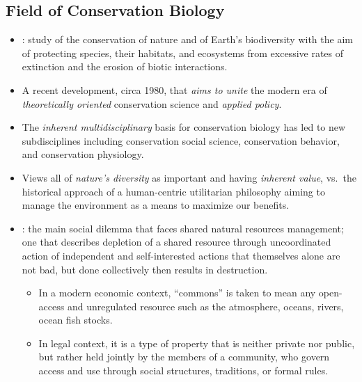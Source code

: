 \documentclass{inVerba-notes}
\begin{document}
\begin{itemize}
    \subsection{Field of Conservation Biology}\label{Field of Conservation Biology}
    \begin{itemize}
        \item {}: study of the conservation of nature and of Earth's biodiversity with the aim of protecting species, their habitats, and ecosystems from excessive rates of extinction and the erosion of biotic interactions.
        \item A recent development, circa 1980, that \emph{aims to unite} the modern era of \emph{theoretically oriented} conservation science and \emph{applied policy}.
        \item The \emph{inherent multidisciplinary} basis for conservation biology has led to new subdisciplines including conservation social science, conservation behavior, and conservation physiology.
        \item Views all of \emph{nature's diversity} as important and having \emph{inherent value}, vs.\ the historical approach of a human-centric utilitarian philosophy aiming to manage the environment as a means to maximize our benefits.
        \item {}: the main social dilemma that faces shared natural resources management; one that describes depletion of a shared resource through uncoordinated action of independent and self-interested actions that themselves alone are not bad, but done collectively then results in destruction.
            \begin{itemize}
                \item In a modern economic context, ``commons'' is taken to mean any open-access and unregulated resource such as the atmosphere, oceans, rivers, ocean fish stocks.
                \item In legal context, it is a type of property that is neither private nor public, but rather held jointly by the members of a community, who govern access and use through social structures, traditions, or formal rules.
            \end{itemize}
    \end{itemize}


\end{itemize}
\end{document}
